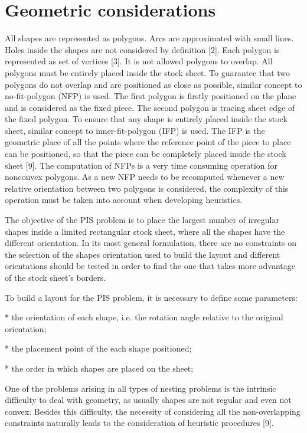 \documentclass{llncs}
\begin{document}
\section{Geometric considerations}
%
All shapes are represented as polygons. Arcs are approximated with small lines. Holes inside the shapes are not considered by definition [2]. Each polygon is represented as set of vertices [3]. It is not allowed polygons to overlap. All polygons must be entirely placed inside the stock sheet. To guarantee that two polygons do not overlap and are positioned as close as possible, similar concept to no-fit-polygon (NFP) is used. The first polygon is firstly positioned on the plane and is considered as the fixed piece. The second polygon is tracing sheet edge of the fixed polygon. To ensure that any shape is entirely placed inside the stock sheet, similar concept to inner-fit-polygon (IFP) is used. The IFP is the geometric place of all the points where the reference point of the piece to place can be positioned, so that the piece can be completely placed inside the stock sheet [9]. The computation of NFPs is a very time consuming operation for nonconvex polygons. As a new NFP needs to be recomputed whenever a new relative orientation between two polygons is considered, the complexity of this operation must be taken into account when developing heuristics.

The objective of the PIS problem is to place the largest number of irregular shapes inside a limited rectangular stock sheet, where all the shapes have the different orientation. In its most general formulation, there are no constraints on the selection of the shapes orientation used to build the layout and different orientations should be tested in order to find the one that takes more advantage of the stock sheet’s borders.

To build a layout for the PIS problem, it is necessary to define some parameters:

* the orientation of each shape, i.e. the rotation angle relative to the original orientation;

* the placement point of the each shape positioned;

* the order in which shapes are placed on the sheet;

One of the problems arising in all types of nesting problems is the intrinsic difficulty to deal with geometry, as usually shapes are not regular and even not convex. Besides this difficulty, the necessity of considering all the non-overlapping constraints naturally leads to the consideration of heuristic procedures [9]. 
%
\end{document}
